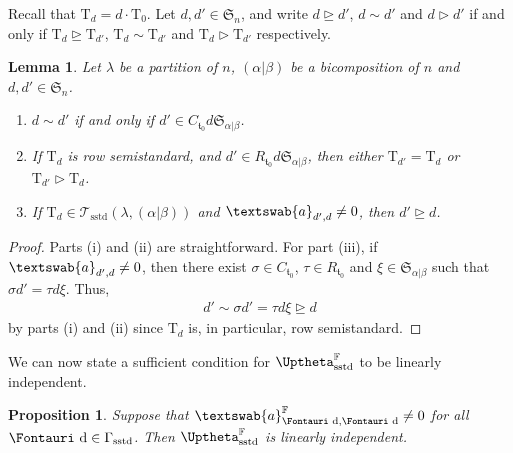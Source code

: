 \documentclass[pdftex]{sigma}
\newtheorem{Lemma}[Theorem]{Lemma}
\newtheorem{Proposition}[Theorem]{Proposition}
 { \theoremstyle{definition}
\newtheorem{Definition}[Theorem]{Definition}
\newtheorem{Example}[Theorem]{Example}
\newtheorem{Remark}[Theorem]{Remark} }
\renewcommand{\t}{\mathfrak{t}}
\renewcommand{\a}{\textswab{a}}
\newcommand{\TTS}{\mathscr{T}_\mathrm{sstd}}
\newcommand{\T}{\mathrm{T}}
\newcommand{\sym}[1]{\mathfrak{S}_{#1}}
\newcommand{\F}{\mathbb{F}}
\newcommand{\dR}{\text{\Fontauri d}}
\newcommand{\JHOM}{\Uptheta}
\newcommand{\hJHOM}{{\JHOM}}
\begin{document}
Recall that $\T_d = d \cdot \T_0$. Let $d,d' \in \sym{n}$, and write $d \unrhd d'$, $d \sim d'$ and $d \rhd d'$ if and only if $\T_d \unrhd \T_{d'}$, $\T_d \sim \T_{d'}$ and $\T_d \rhd \T_{d'}$ respectively.

\begin{Lemma} \label{L:pre-order}
	Let $\lambda$ be a partition of $n$, $(\alpha|\beta)$ be a bicomposition of $n$ and $d,d' \in \sym{n}$.
	\begin{enumerate}\itemsep=0pt
\item[$(i)$] $d \sim d'$ if and only if $d' \in C_{\t_0} d \sym{\alpha|\beta}$.
\item[$(ii)$] If $\T_d$ is row semistandard, and $d' \in R_{\t_0} d \sym{\alpha|\beta}$, then either $\T_{d'} = \T_d$ or $\T_{d'} \rhd \T_d$.
\item[$(iii)$] If $\T_{d} \in \TTS(\lambda, (\alpha|\beta))$ and $\a_{d', d} \ne 0$, then $d' \unrhd d$.
	\end{enumerate}
\end{Lemma}

\begin{proof}
	Parts (i) and (ii) are straightforward. For part (iii), if $\a_{d',d} \ne 0$, then there exist $\sigma \in C_{\t_0}$, $\tau \in R_{\t_0}$ and $\xi \in \sym{\alpha|\beta}$ such that $\sigma d' = \tau d \xi$. Thus,
	\begin{gather*}d' \sim \sigma d' = \tau d \xi \unrhd d\end{gather*} by parts (i) and (ii) since $\T_d$ is, in particular, row semistandard.
\end{proof}

We can now state a sufficient condition for $\hJHOM_{\mathrm{sstd}}^\F$ to be linearly independent.

\begin{Proposition} \label{P:phihatli}
	Suppose that $\a^{\F}_{\dR,\dR} \ne 0$ for all $\dR \in \Gamma_{\mathrm{sstd}}$. Then $\hJHOM_{\mathrm{sstd}}^{\F}$ is linearly independent.
\end{Proposition}
\end{document}
